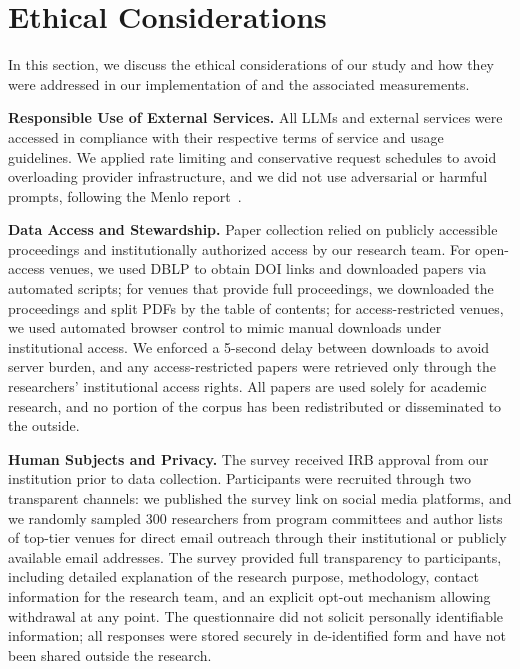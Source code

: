 \section*{Ethical Considerations}
\label{sec:ethics}
In this section, we discuss the ethical considerations of our study and how they were addressed in our implementation of \citeb and the associated measurements.

\noindent\textbf{Responsible Use of External Services.}
\label{sec:ethical_use_external_services}
All LLMs and external services were accessed in compliance with their respective terms of service and usage guidelines.
We applied rate limiting and conservative request schedules to avoid overloading provider infrastructure, and we did not use adversarial or harmful prompts, following the Menlo report~\cite{bailey2012menlo}.

\noindent\textbf{Data Access and Stewardship.}
\label{sec:data_stewardship}
Paper collection relied on publicly accessible proceedings and institutionally authorized access by our research team.
For open-access venues, we used DBLP to obtain DOI links and downloaded papers via automated scripts; for venues that provide full proceedings, we downloaded the proceedings and split PDFs by the table of contents; for access-restricted venues, we used automated browser control to mimic manual downloads under institutional access.
We enforced a 5-second delay between downloads to avoid server burden, and any access-restricted papers were retrieved only through the researchers' institutional access rights.
All papers are used solely for academic research, and no portion of the corpus has been redistributed or disseminated to the outside.

\noindent\textbf{Human Subjects and Privacy.}
The survey received IRB approval from our institution prior to data collection.
Participants were recruited through two transparent channels: we published the survey link on social media platforms, and we randomly sampled 300 researchers from program committees and author lists of top-tier venues for direct email outreach through their institutional or publicly available email addresses.
The survey provided full transparency to participants, including detailed explanation of the research purpose, methodology, contact information for the research team, and an explicit opt-out mechanism allowing withdrawal at any point.
The questionnaire did not solicit personally identifiable information; all responses were stored securely in de-identified form and have not been shared outside the research.

